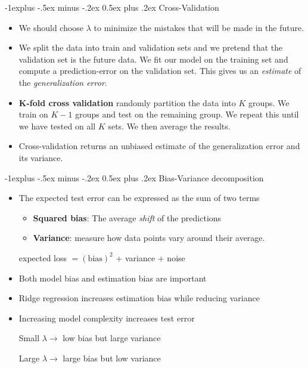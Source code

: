 \documentclass[10pt,a4paper,landscape]{article}
\makeatletter
\renewcommand{\subsection}{\@startsection{subsection}{2}{0mm}%
                                {-1explus -.5ex minus -.2ex}%
                                {0.5ex plus .2ex}%
                                {\normalfont\tiny\bfseries}}
\makeatother
\begin{document}
\begin{multicols*}{5}
\subsection{Cross-Validation}
\begin{itemize}
    \item We should choose $\lambda$ to minimize the mistakes that will be made in the future.
    \item We split the data into train and validation sets and we pretend that the validation set is the future data. We fit our model on the training set and compute a prediction-error on the validation set. This gives us an \textit{estimate} of the \textit{generalization error}.
    \item \textbf{K-fold cross validation} randomly partition the data into $K$ groups. We train on $K - 1$ groups and test on the remaining group. We repeat this until we have tested on all $K$ sets. We then average the results.
    \item Cross-validation returns an unbiased estimate of the generalization error and its variance.
\end{itemize}

\subsection{Bias-Variance decomposition}
\begin{itemize}
    \item The expected test error can be expressed as the sum of two terms
    \begin{itemize}
        \item \textbf{Squared bias}: The average \textit{shift} of the predictions 
        \item \textbf{Variance}: measure how data points vary around their average.
     \end{itemize} 
     \begin{center}
        expected loss $= (\text{bias})^2$ + variance + noise
     \end{center}
    \item Both model bias and estimation bias are important
    \item Ridge regression increases estimation bias while reducing variance
    \item Increasing model complexity increases test error
    \begin{center}
        Small $\lambda \rightarrow$ low bias but large variance
    \end{center}
    \begin{center}
        Large $\lambda \rightarrow$ large bias but low variance
    \end{center}
\end{itemize}


\end{multicols*}
\end{document}
